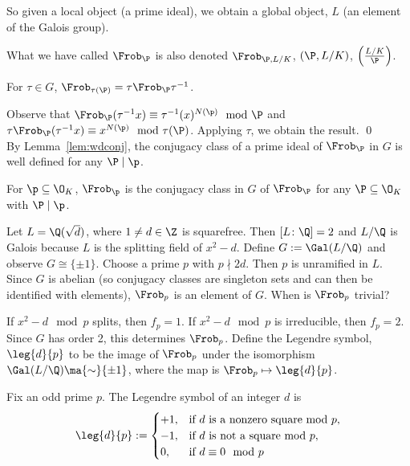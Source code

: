 So given a local object (a prime ideal), we obtain a global object, $L$ (an element of the Galois group). 

\begin{rem}
What we have called $\Frob_\P$ is also denoted $\Frob_{\P,L/K}$, $(\P,L/K)$, $\left(\frac{L/K}{\P}\right)$.
\end{rem}

\begin{lem}\label{lem:wdconj}
For $\tau \in G$, $\Frob_{\tau(\P)}= \tau \Frob_\P \tau^{-1}$.
\end{lem}

\pf Observe that $\Frob_\P(\tau^{-1}x) \equiv \tau^{-1}(x)^{N(\p)} \mod \P$ and $\tau \Frob_\P(\tau^{-1} x) \equiv x^{N(\p)} \mod \tau(\P)$. Applying $\tau$, we obtain the result. \qed \\

By Lemma~\ref{lem:wdconj}, the conjugacy class of a prime ideal of $\Frob_\P$ in $G$ is well defined for any $\P \mid \p$. 

\begin{dfn}
For $\p \subseteq \O_K$, $\Frob_\p$ is the conjugacy class in $G$ of $\Frob_\P$ for any $\P \subseteq \O_K$ with $\P \mid \p$. 
\end{dfn}


\begin{ex}\label{ex:legrec}
Let $L=\Q(\sqrt{d})$, where $1 \neq d \in \Z$ is squarefree. Then $[L \colon \Q]=2$ and $L/\Q$ is Galois because $L$ is the splitting field of $x^2-d$. Define $G:=\Gal(L/\Q)$ and observe $G \cong \{\pm1\}$. Choose a prime $p$ with $p \nmid 2d$. Then $p$ is unramified in $L$. Since $G$ is abelian (so conjugacy classes are singleton sets and can then be identified with elements), $\Frob_p$ is an element of $G$. When is $\Frob_p$ trivial? 

If $x^2-d \mod p$ splits, then $f_p=1$. If $x^2-d \mod p$ is irreducible, then $f_p=2$. Since $G$ has order 2, this determines $\Frob_p$. Define the Legendre symbol, $\leg{d}{p}$ to be the image of $\Frob_p$ under the isomorphism $\Gal(L/\Q) \ma{\sim} \{\pm 1\}$, where the map is $\Frob_p \mapsto \leg{d}{p}$. \xqed
\end{ex}


\begin{dfn}
Fix an odd prime $p$. The Legendre symbol of an integer $d$ is
	\[
	\leg{d}{p}:=
	\begin{cases}
	+1, & \text{if }d \text{ is a nonzero square mod }p, \\
	-1, & \text{if }d \text{ is not a square mod }p, \\
	0, & \text{if } d \equiv 0 \mod p
	\end{cases}
	\]
\end{dfn}


